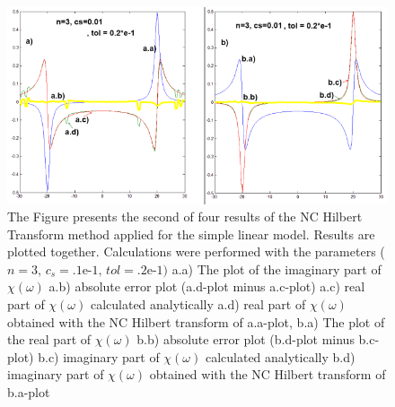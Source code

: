 \documentclass[12pt,twoside,a4paper]{article}
\numberwithin{equation}{subsection}
\numberwithin{figure}{subsection}
\begin{document}
\begin{figure}
  \includegraphics[width=150mm]{img/nc_lin2.png}
  \caption{ The Figure presents the second of four results of the NC Hilbert Transform method applied for the simple linear model. Results are plotted together. Calculations were performed with the parameters ($n = 3, \, c_s = \mbox{.1e-1}, \, tol = \mbox{.2e-1})$
     a.a) The plot of the imaginary part of $\chi (\omega )$
     a.b) absolute error plot (a.d-plot minus a.c-plot) 
     a.c) real part of $\chi (\omega )$ calculated analytically 
     a.d) real part of $\chi (\omega )$ obtained with the NC Hilbert transform of a.a-plot, 
     b.a) The plot of the real part of $\chi (\omega )$
     b.b) absolute error plot (b.d-plot minus b.c-plot)
     b.c) imaginary part of $\chi (\omega )$ calculated analytically 
     b.d) imaginary part of $\chi (\omega )$ obtained with the NC Hilbert transform of b.a-plot
     \label{fig:nc_lin2} 
  }
\end{figure}  
\end{document}

